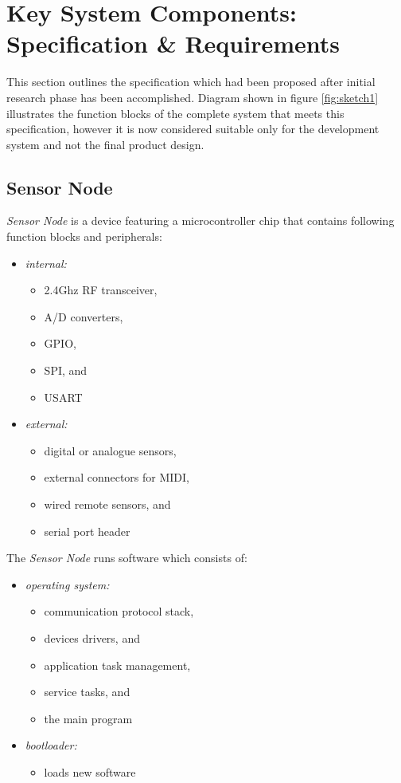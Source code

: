 \section{Key System Components: \\ Specification \& Requirements} \label{sec:SPECS}

  This section outlines the specification which had been proposed
 after initial research phase has been accomplished. Diagram shown
 in figure \ref{fig:sketch1} illustrates the function blocks of the
 complete system that meets this specification, however it is now
 considered suitable only for the development system and not the
 final product design.

\subsection*{Sensor Node}

\emph{Sensor Node} is a device featuring a microcontroller chip
that contains following function blocks and peripherals:

\begin{itemize}
	\item \emph{internal:}
	\begin{itemize}
		\item 2.4Ghz RF transceiver,
		\item A/D converters,
		\item GPIO,
		\item SPI, and
		\item USART
	\end{itemize}
	
	\item \emph{external:}
	\begin{itemize}
		\item digital or analogue sensors,
		\item external connectors for MIDI,
		\item wired remote sensors, and
		\item serial port header
	\end{itemize}
\end{itemize}

The \emph{Sensor Node} runs software which consists of:

\begin{itemize}
	\item \emph{operating system:}
	\begin{itemize}
		\item communication protocol stack,
		\item devices drivers, and
		\item application task management,
		\item service tasks, and
		\item the main program
	\end{itemize}
	\item \emph{bootloader:}
	\begin{itemize}
		\item loads new software
	\end{itemize}
\end{itemize}

